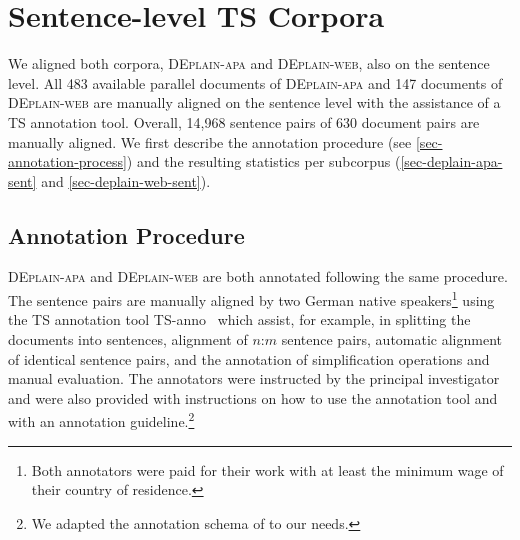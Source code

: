\documentclass[11pt]{article}
\begin{document}
\section{Sentence-level TS Corpora}
We aligned both corpora, \textsc{DEplain-apa} and \textsc{DEplain-web}, also on the sentence level. All 483 available parallel documents of \textsc{DEplain-apa}  and 147 documents of \textsc{DEplain-web} are manually aligned on the sentence level with the assistance of a TS annotation tool. Overall, 14,968 sentence pairs of 630  document pairs are manually aligned. We first describe the annotation procedure (see \autoref{sec-annotation-process}) and the resulting statistics per subcorpus (\autoref{sec-deplain-apa-sent} and \autoref{sec-deplain-web-sent}). 




\subsection{Annotation Procedure}
\label{sec-annotation-process}
\textsc{DEplain-apa} and \textsc{DEplain-web} are both annotated following the same procedure. The sentence pairs are manually aligned by two German native speakers\footnote{Both annotators  were paid for their work with at least the minimum wage of their country of residence.} using the TS annotation tool TS-anno~\cite{stodden-kallmeyer-2022-ts} which assist, for example, in splitting the documents into sentences, alignment of $n$:$m$ sentence pairs, automatic alignment of identical sentence pairs, and the annotation of simplification operations and manual evaluation. The annotators were instructed by the principal investigator and were also provided with instructions on how to use the annotation tool and with an annotation guideline.\footnote{We adapted the annotation schema of \citet{stodden-kallmeyer-2022-ts} to our needs.} 
\end{document}
